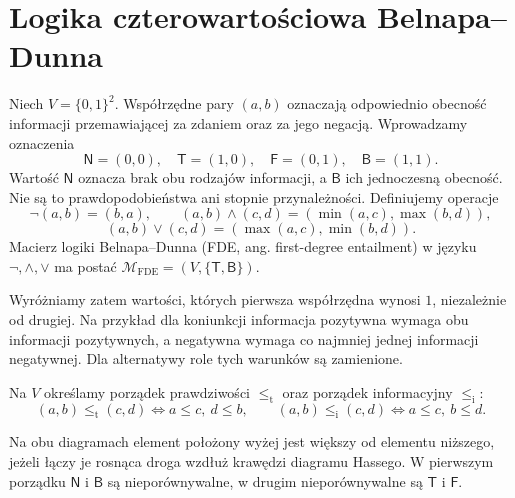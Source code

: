 \section{Logika czterowartościowa Belnapa--Dunna}
\begin{definicja}
\label{def:ncl-four-values}
Niech $V=\{0,1\}^2$. Współrzędne pary $(a,b)$
oznaczają odpowiednio obecność informacji przemawiającej
za zdaniem oraz za jego negacją. Wprowadzamy oznaczenia
\[
 \mathsf N=(0,0),\quad \mathsf T=(1,0),\quad
 \mathsf F=(0,1),\quad \mathsf B=(1,1).
\]
Wartość $\mathsf N$ oznacza brak obu rodzajów informacji,
a $\mathsf B$ ich jednoczesną obecność. Nie są to
prawdopodobieństwa ani stopnie przynależności.
Definiujemy operacje
\[
 \neg(a,b)=(b,a),\qquad
 (a,b)\wedge(c,d)=(\min(a,c),\max(b,d)),
\]
\[
 (a,b)\vee(c,d)=(\max(a,c),\min(b,d)).
\]
Macierz logiki Belnapa--Dunna (FDE, ang. first-degree
entailment) w języku $\neg,\wedge,\vee$ ma postać
$\mathcal M_{\mathrm{FDE}}=(V,\{\mathsf T,\mathsf B\})$.
\end{definicja}
Wyróżniamy zatem wartości, których pierwsza współrzędna
wynosi $1$, niezależnie od drugiej.
Na przykład dla koniunkcji informacja pozytywna wymaga
obu informacji pozytywnych, a negatywna wymaga
co najmniej jednej informacji negatywnej.
Dla alternatywy role tych warunków są zamienione.

\begin{definicja}\label{def:ncl-bilattice-orders}
Na $V$ określamy porządek prawdziwości $\leq_{\mathrm t}$
oraz porządek informacyjny $\leq_{\mathrm i}$:
\[
 (a,b)\leq_{\mathrm t}(c,d)\iff a\leq c,\ d\leq b,
 \qquad
 (a,b)\leq_{\mathrm i}(c,d)\iff a\leq c,\ b\leq d.
\]
\end{definicja}
\begin{center}
\end{center}
Na obu diagramach element położony wyżej jest większy
od elementu niższego, jeżeli łączy je rosnąca droga
wzdłuż krawędzi diagramu Hassego. W pierwszym porządku
$\mathsf N$ i $\mathsf B$ są nieporównywalne,
w drugim nieporównywalne są $\mathsf T$ i $\mathsf F$.

